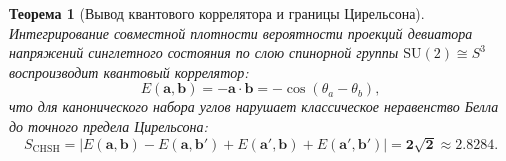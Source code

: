 \documentclass[12pt,a4paper]{article}
\newtheorem{theorem}{Теорема}
\begin{document}
	\begin{theorem}[Вывод квантового коррелятора и границы Цирельсона]
		Интегрирование совместной плотности вероятности проекций девиатора напряжений синглетного состояния по слою спинорной группы $\mathrm{SU}(2) \cong S^3$ воспроизводит квантовый коррелятор:
		\begin{equation}
			E(\mathbf{a}, \mathbf{b}) = -\mathbf{a} \cdot \mathbf{b} = -\cos(\theta_a - \theta_b),
		\end{equation}
		что для канонического набора углов нарушает классическое неравенство Белла до точного предела Цирельсона:
		\begin{equation}
			S_{\mathrm{CHSH}} = \left| E(\mathbf{a}, \mathbf{b}) - E(\mathbf{a}, \mathbf{b}') + E(\mathbf{a}', \mathbf{b}) + E(\mathbf{a}', \mathbf{b}') \right| = \mathbf{2\sqrt{2} \approx 2.8284}.
		\end{equation}
	\end{theorem}
	
	
\end{document}
